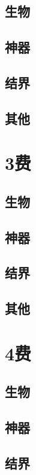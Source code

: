 \documentclass[lang = cn, color = black, 10pt]{AllThatStax}
\begin{document}
\section{生物}

\section{神器}

\section{结界}

\section{其他}

\chapter{3费}

\section{生物}

\section{神器}

\section{结界}

\section{其他}

\chapter{4费}

\section{生物}

\section{神器}

\section{结界}
\end{document}
